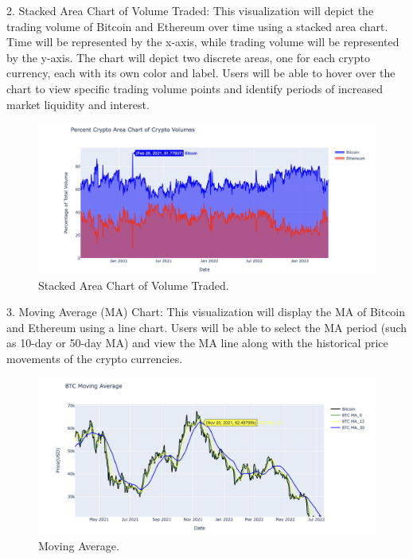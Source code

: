 \documentclass[10pt,twocolumn,a4paper]{article}
\begin{document}
2. Stacked Area Chart of Volume Traded: This visualization will depict the trading volume of Bitcoin and Ethereum over time using a stacked area chart. Time will be represented by the x-axis, while trading volume will be represented by the y-axis. The chart will depict two discrete areas, one for each crypto currency, each with its own color and label. Users will be able to hover over the chart to view specific trading volume points and identify periods of increased market liquidity and interest.
\begin{figure}[!h]
  \centering
  \includegraphics[width=1\linewidth]{Stacked_Area.png}
  \caption{Stacked Area Chart of Volume Traded.}
  \label{fig:example}
\end{figure}


3. Moving Average (MA) Chart: This visualization will display the MA of Bitcoin and Ethereum using a line chart. Users will be able to select the MA period (such as 10-day or 50-day MA) and view the MA line along with the historical price movements of the crypto currencies.
\begin{figure}[!h]
  \centering
  \includegraphics[width=1\linewidth]{MA.png}
  \caption{Moving Average.}
  \label{fig:example}
\end{figure}
\end{document}
